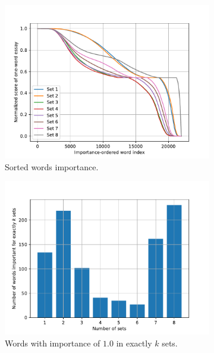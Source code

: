 \documentclass[a4paper,12pt,english]{article}
\begin{document}
\begin{figure}
	\begin{subfigure}{\textwidth}
		\centering
		\includegraphics[width=0.8\linewidth]{fig/words_importance.pdf}
		\caption{Sorted words importance.}
		\label{fig:importance}
	\end{subfigure}
	\newline
	\begin{subfigure}{.5\textwidth}
		\centering
		\includegraphics[width=\linewidth]{fig/words_important_in_k_sets.pdf}
		\caption{Words with importance of $1.0$ in exactly $k$ sets.}
		\label{fig:exactlyk}
	\end{subfigure}
	\begin{subfigure}{.5\textwidth}
		\centering

\end{subfigure}
\end{figure}
\end{document}
